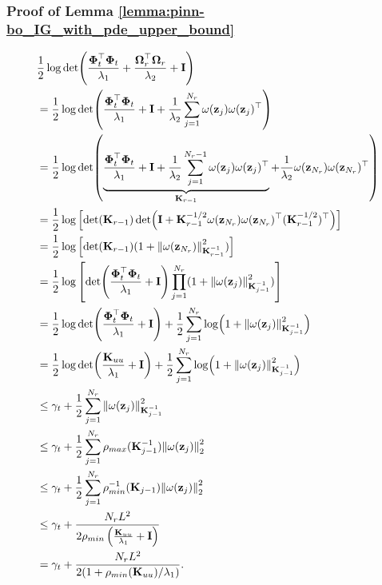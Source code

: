 \subsubsection{Proof of Lemma \ref{lemma:pinn-bo_IG_with_pde_upper_bound}}
\begin{align*}
            & \frac{1}{2}\log \det(\frac{\boldsymbol{\Phi}_t^\top \boldsymbol{\Phi}_t}{\lambda_1} + \frac{\boldsymbol{\Omega}_r^\top \boldsymbol{\Omega}_r}{\lambda_2} + \mathbf{I}) \\
            & = \frac{1}{2}\log \det(\frac{\boldsymbol{\Phi}_t^\top \boldsymbol{\Phi}_t}{\lambda_1} +  \mathbf{I} + \frac{1}{\lambda_2} \sum_{j=1}^{N_r} \omega(\mathbf{z}_j) \omega(\mathbf{z}_j)^\top) 
            \\
            & = \frac{1}{2}\log \det( \underbrace{\frac{\boldsymbol{\Phi}_t^\top \boldsymbol{\Phi}_t}{\lambda_1} +  \mathbf{I} + \frac{1}{\lambda_2} \sum_{j=1}^{N_r-1} \omega(\mathbf{z}_j) \omega(\mathbf{z}_j)^\top}_{\mathbf{K}_{r-1}} + \frac{1}{\lambda_2} \omega(\mathbf{z}_{N_r}) \omega(\mathbf{z}_{N_r})^\top) 
            \\
             & = \frac{1}{2}\log \left[ \det(\mathbf{K}_{r-1}) \det(\mathbf{I} + \mathbf{K}_{r-1}^{-1/2}\omega(\mathbf{z}_{N_r}) \omega(\mathbf{z}_{N_r})^\top(\mathbf{K}_{r-1}^{-1/2})^\top) \right]
             \\
             & = \frac{1}{2}\log \left[ \det(\mathbf{K}_{r-1}) (1+\norm{\omega(\mathbf{z}_{N_r})}^2_{\mathbf{K}^{-1}_{r-1}}) \right] 
             \\
             & = \frac{1}{2}\log \left[ \det(\frac{\boldsymbol{\Phi}_t^\top \boldsymbol{\Phi}_t}{\lambda_1} + \mathbf{I}) \prod_{j=1}^{N_r}(1+\norm{\omega(\mathbf{z}_j)}^2_{\mathbf{K}^{-1}_{j-1}}) \right] 
             \\
             & = \frac{1}{2}\log \det(\frac{\boldsymbol{\Phi}_t^\top \boldsymbol{\Phi}_t}{\lambda_1} + \mathbf{I}) + \frac{1}{2} \sum_{j=1}^{N_r} \log(1+\norm{\omega(\mathbf{z}_j)}^2_{\mathbf{K}^{-1}_{j-1}}) 
             \\
             & = \frac{1}{2}\log \det(\frac{\mathbf{K}_{uu}}{\lambda_1} + \mathbf{I}) + \frac{1}{2} \sum_{j=1}^{N_r} \log(1+\norm{\omega(\mathbf{z}_j)}^2_{\mathbf{K}^{-1}_{j-1}})
             \\
             & \le \gamma_t + \frac{1}{2} \sum_{j=1}^{N_r} \norm{\omega(\mathbf{z}_j)}^2_{\mathbf{K}^{-1}_{j-1}} 
             \\
             &  \le \gamma_t + \frac{1}{2} \sum_{j=1}^{N_r} \rho_{max}(\mathbf{K}^{-1}_{j-1}) \norm{\omega(\mathbf{z}_j)}_2^2
             \\
             & \le \gamma_t + \frac{1}{2}\sum_{j=1}^{N_r} \rho_{min}^{-1}(\mathbf{K}_{j-1}) \norm{\omega(\mathbf{z}_j)}_2^2
             \\
             & \le \gamma_t + \frac{N_r L^2}{2 \rho_{min}\left(\frac{\mathbf{K}_{uu}}{\lambda_1} + \mathbf{I}\right)} 
             \\
             &= \gamma_t + \frac{N_r L^2}{2(1+ \rho_{min}(\mathbf{K}_{uu})/\lambda_1)}.
    \end{align*}

